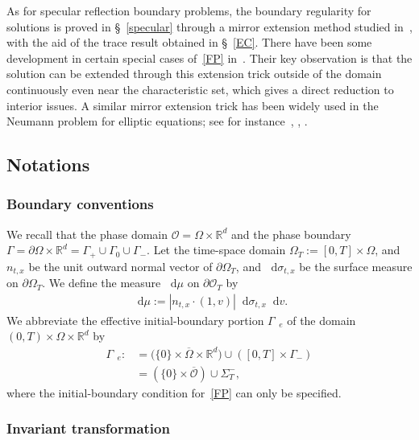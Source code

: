 \documentclass[10pt]{amsart}
\theoremstyle{definition}\newtheorem{defi}[theo]{Definition}\newtheorem{rema}[theo]{Remark}\newtheorem{exam}[theo]{Example}\newtheorem{exem}[theo]{Example}\newtheorem{nota}[theo]{Notation}
\newcommand*{\dif}{\mathop{}\!\mathrm{d}}
\newcommand*\p{\partial}
\newcommand*\R {\mathbb{R}}
\newcommand*\Ge {\Gamma_{\;\!\!\;\!\!e}}
\newcommand*\OO {\mathcal{O}}
\begin{document}
As for specular reflection boundary problems, the boundary regularity for solutions is proved in \S~\ref{specular} through a mirror extension method studied in~\cite{GHJO,Nier}, with the aid of the trace result obtained in \S~\ref{EC}. There have been some development in certain special cases of~\eqref{FP} in~\cite{DGY,GHJO}. Their key observation is that the solution can be extended through this extension trick outside of the domain continuously even near the characteristic set, which gives a direct reduction to interior issues. A similar mirror extension trick has been widely used in the Neumann problem for elliptic equations; see for instance~\cite[Section~2.4.3]{Tro}, \cite[Proof of Theorem~2.5]{DK}, \cite[Section~9.1.8]{Nier}.

\subsection{Notations}
\subsubsection{Boundary conventions} 

We recall that the phase domain $\OO=\Omega\times\R^d$ and the phase boundary $\Gamma=\p\Omega\times\R^d=\Gamma_+\cup\Gamma_0\cup\Gamma_-$. Let the time-space domain $\Omega_T:=[0,T]\times\Omega$, and $n_{t,x}$ be the unit outward normal vector of $\p\Omega_T$, and $\dif\sigma_{t,x}$ be the surface measure on $\p\Omega_T$. We define the measure $\dif\mu$ on $\p\OO_T$ by
\begin{align*}
\dif\mu:=\left|n_{t,x}\cdot (1,v)\right|\dif\sigma_{t,x}\dif v.
\end{align*}
We abbreviate the effective initial-boundary portion $\Ge$ of the domain $(0,T)\times\Omega\times\R^d$ by
\begin{align*}
\Ge:&=\big(\{0\}\times\overline{\Omega}\times\R^d\big)
\cup\left([0,T]\times\Gamma_-\right)\\ &=\left(\{0\}\times\overline{\OO}\right)\cup\Sigma_T^-,
\end{align*}
where the initial-boundary condition for~\eqref{FP} can only be specified.

\subsubsection{Invariant transformation}\label{invariant}
\end{document}
